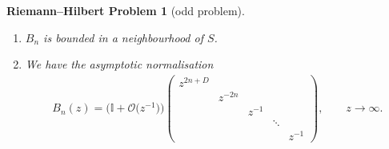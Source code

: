 \documentclass[pdftex]{sigma}
\numberwithin{equation}{section}
\newtheorem{rhp}[Theorem]{Riemann--Hilbert Problem}
\begin{document}
\begin{rhp}[odd problem]
\begin{enumerate}
\begin{gather*}
\begin{array}{ccccccccccccccccccc}
& & & & 1 \\
& & & & & 1 \\
\end{array} \right), \\
 x \in \Sigma \setminus S.
\end{gather*}
\item[$(3)$] $B_{n}$ is bounded in a neighbourhood of $S$.
\item[$(4)$] We have the asymptotic normalisation
\begin{align*}
B_{n}(z) = \big(\mathbb{I}+ \mathcal{O}\big(z^{-1}\big)\big) \left(\begin{matrix}
z^{2n+D} \\
& z^{-2n} \\
& & z^{-1} \\
& & & \ddots \\
& & & & z^{-1}
\end{matrix} \right),\qquad z \to \infty.
\end{align*}
\end{enumerate}
\end{rhp}
\end{document}
